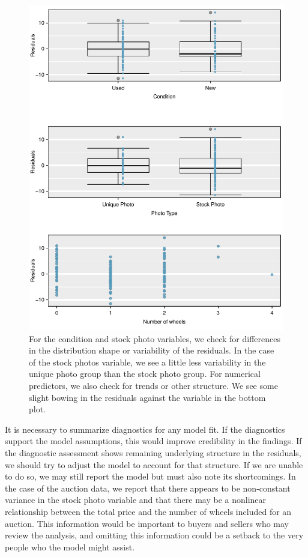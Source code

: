 \begin{description}
\begin{figure}
\centering
\includegraphics[width=\textwidth]{ch_regr_mult_and_log/figures/marioKartDiagnostics/mkDiagnosticEvsVariables}
\caption{For the condition and stock photo variables, we check for differences in the distribution shape or variability of the residuals. In the case of the stock photos variable, we see a little less variability in the unique photo group than the stock photo group. For numerical predictors, we also check for trends or other structure. We see some slight bowing in the residuals against the  variable in the bottom plot.}
\label{mkDiagnosticEvsVariables}
\end{figure}

\end{description}

It is necessary to summarize diagnostics for any model fit. If the diagnostics support the model assumptions, this would improve credibility in the findings. If the diagnostic assessment shows remaining underlying structure in the residuals, we should try to adjust the model to account for that structure. If we are unable to do so, we may still report the model but must also note its shortcomings. In the case of the auction data, we report that there appears to be non-constant variance in the stock photo variable and that there may be a nonlinear relationship between the total price and the number of wheels included for an auction. This information would be important to buyers and sellers who may review the analysis, and omitting this information could be a setback to the very people who the model might assist.

